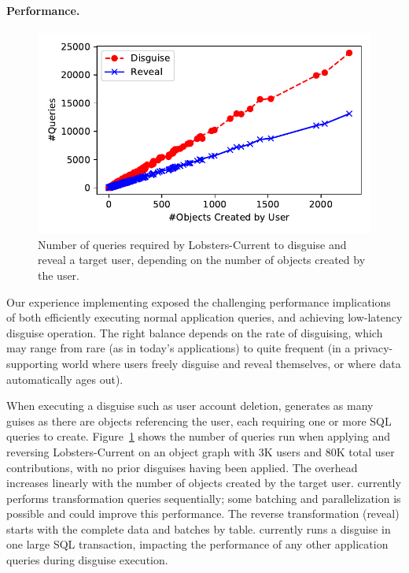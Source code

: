 \paragraph{Performance.}
\label{sec:perf}

\begin{figure}[t!]
    \centerline{\includegraphics[width=.5\textwidth]{img/perf}}
    \vspace{-\baselineskip}
    \caption{Number of queries required by Lobsters-Current to disguise and reveal a target user, depending on the number of
    objects created by the user.}
    \label{fig:latencies}
    \vspace{-\baselineskip}
\end{figure}

Our experience implementing \sys exposed the challenging performance implications of both efficiently
executing normal application queries, and achieving low-latency disguise operation. The right
balance depends on the rate of disguising, which may range from rare (as in today's applications)
to quite frequent (in a privacy-supporting world where users freely disguise and reveal themselves,
or where data automatically ages out).

%
When executing a disguise such as user account deletion, \sys generates as many guises as there are
objects referencing the user, each requiring one or more SQL queries to create.
%
Figure~\ref{fig:latencies} shows the number of queries run when applying and reversing
Lobsters-Current on an object graph with 3K users and 80K total user contributions, with no prior
disguises having been applied.
%
The overhead increases linearly with the number of objects created by the target user.  \sys
currently performs transformation queries sequentially; some batching and parallelization is
possible and could improve this performance.
%
The reverse transformation (reveal) starts with the complete data and batches by table.
%
\sys currently runs a disguise in one large SQL transaction, impacting the performance of any other
application queries during disguise execution.

